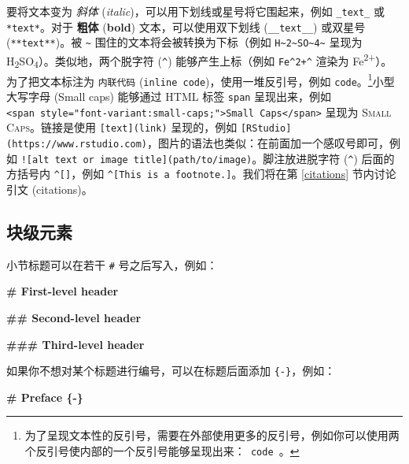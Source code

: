 \documentclass[
  12pt,
]{krantz}
\newenvironment{Shaded}{\begin{snugshade}}{\end{snugshade}}
\newcommand{\FunctionTok}[1]{\textcolor[rgb]{0.13,0.29,0.53}{\textbf{#1}}}
\theoremstyle{definition}
\theoremstyle{definition}
\theoremstyle{definition}
\theoremstyle{definition}
\theoremstyle{remark}
\begin{document}
要将文本变为 \emph{斜体} (\emph{italic})，可以用下划线或星号将它围起来，例如 \texttt{\_text\_} 或 \texttt{*text*}。对于 \textbf{粗体} (\textbf{bold}) 文本，可以使用双下划线 (\texttt{\_\_text\_\_}) 或双星号 (\texttt{**text**})。被 \texttt{\textasciitilde{}} 围住的文本将会被转换为下标（例如 \texttt{H\textasciitilde{}2\textasciitilde{}SO\textasciitilde{}4\textasciitilde{}} 呈现为 H\textsubscript{2}SO\textsubscript{4}）。类似地，两个脱字符 (\texttt{\^{}}) 能够产生上标（例如 \texttt{Fe\^{}2+\^{}} 渲染为 Fe\textsuperscript{2+}）。为了把文本标注为 \texttt{内联代码} (\texttt{inline\ code})，使用一堆反引号，例如 \texttt{\textasciigrave{}code\textasciigrave{}}。\footnote{为了呈现文本性的反引号，需要在外部使用更多的反引号，例如你可以使用两个反引号使内部的一个反引号能够呈现出来：\texttt{\textasciigrave{}\textasciigrave{}\ \textasciigrave{}code\textasciigrave{}\ \textasciigrave{}\textasciigrave{}}。}小型大写字母 (Small caps) 能够通过 HTML 标签 \texttt{span} 呈现出来，例如 \texttt{\textless{}span\ style="font-variant:small-caps;"\textgreater{}Small\ Caps\textless{}/span\textgreater{}} 呈现为 \textsc{Small Caps}。链接是使用 \texttt{{[}text{]}(link)} 呈现的，例如 \texttt{{[}RStudio{]}(https://www.rstudio.com)}，图片的语法也类似：在前面加一个感叹号即可，例如 \texttt{!{[}alt\ text\ or\ image\ title{]}(path/to/image)}。脚注放进脱字符 (\texttt{\^{}}) 后面的方括号内 \texttt{\^{}{[}{]}}，例如 \texttt{\^{}{[}This\ is\ a\ footnote.{]}}。我们将在第 \ref{citations} 节内讨论引文 (citations)。

\subsection{块级元素}\label{ux5757ux7ea7ux5143ux7d20}

小节标题可以在若干 \texttt{\#} 号之后写入，例如：

\begin{Shaded}
\begin{Highlighting}[]
\FunctionTok{\# First{-}level header}

\FunctionTok{\#\# Second{-}level header}

\FunctionTok{\#\#\# Third{-}level header}
\end{Highlighting}
\end{Shaded}

如果你不想对某个标题进行编号，可以在标题后面添加 \texttt{\{-\}}，例如：

\begin{Shaded}
\begin{Highlighting}[]
\FunctionTok{\# Preface \{{-}\}}
\end{Highlighting}
\end{Shaded}
\end{document}
